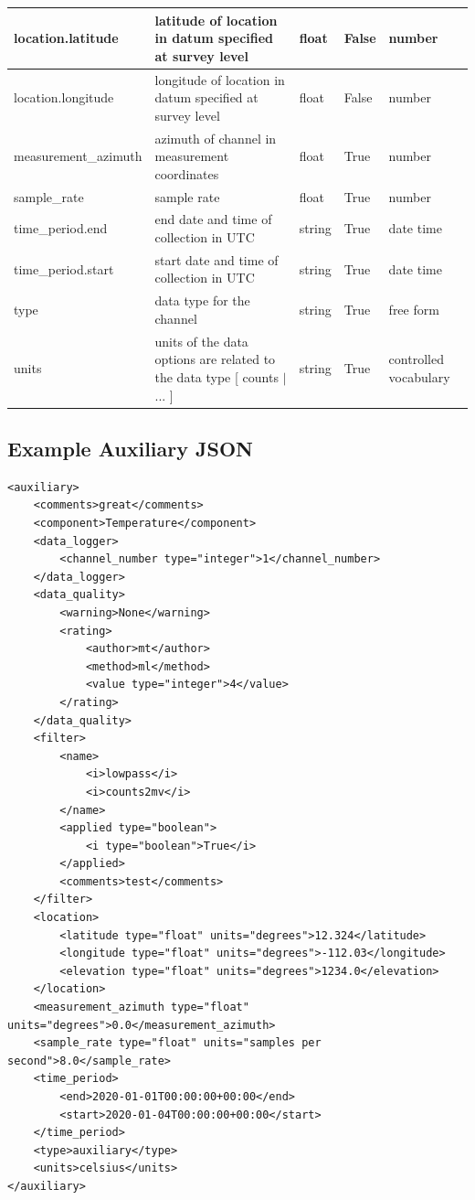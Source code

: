 \documentclass[12pt]{article}
\begin{document}
\begin{table}[htb!]
\begin{tabular}{|l|p{2.75in}|l|l|p{.95in}|}
        location.latitude & latitude of location in datum specified at survey level & float & False & number  \\ \hline
        location.longitude & longitude of location in datum specified at survey level & float & False & number  \\ \hline
        measurement\_azimuth & azimuth of channel in measurement coordinates & float & True & number  \\ \hline
        sample\_rate & sample rate & float & True & number  \\ \hline
        time\_period.end & end date and time of collection in UTC & string & True & date time  \\ \hline
        time\_period.start & start date and time of collection in UTC & string & True & date time  \\ \hline
        type & data type for the channel & string & True & free form  \\ \hline
        units & units of the data options are related to the data type [ counts $|$ ... ] & string & True & controlled vocabulary \\ \hline
    \end{tabular}
    \label{tab:aux}
\end{table}

\newpage
\subsection{Example Auxiliary JSON} 

\begin{verbatim}
<auxiliary>
    <comments>great</comments>
    <component>Temperature</component>
    <data_logger>
        <channel_number type="integer">1</channel_number>
    </data_logger>
    <data_quality>
        <warning>None</warning>
        <rating>
            <author>mt</author>
            <method>ml</method>
            <value type="integer">4</value>
        </rating>
    </data_quality>
    <filter>
        <name>
            <i>lowpass</i>
            <i>counts2mv</i>
        </name>
        <applied type="boolean">
            <i type="boolean">True</i>
        </applied>
        <comments>test</comments>
    </filter>
    <location>
        <latitude type="float" units="degrees">12.324</latitude>
        <longitude type="float" units="degrees">-112.03</longitude>
        <elevation type="float" units="degrees">1234.0</elevation>
    </location>
    <measurement_azimuth type="float" units="degrees">0.0</measurement_azimuth>
    <sample_rate type="float" units="samples per second">8.0</sample_rate>
    <time_period>
        <end>2020-01-01T00:00:00+00:00</end>
        <start>2020-01-04T00:00:00+00:00</start>
    </time_period>
    <type>auxiliary</type>
    <units>celsius</units>
</auxiliary>
\end{verbatim}
\end{document}
